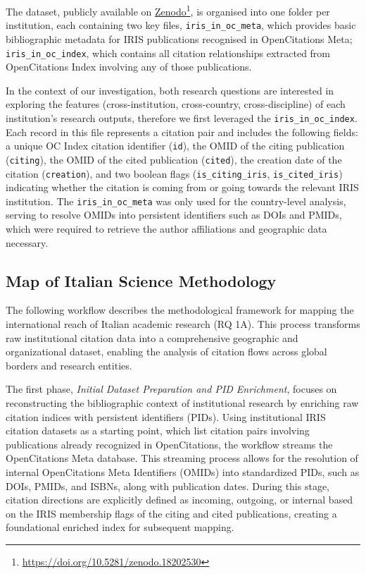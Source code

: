 \documentclass[year=2026]{cup-journal}
\begin{document}
The dataset, publicly available on \href{https://doi.org/10.5281/zenodo.18202530}{Zenodo}\footnote{\url{https://doi.org/10.5281/zenodo.18202530}}, is organised into one folder per institution, each containing two key files, \verb|iris_in_oc_meta|, which provides basic bibliographic metadata for IRIS publications recognised in OpenCitations Meta; \verb|iris_in_oc_index|, which contains all citation relationships extracted from OpenCitations Index involving any of those publications. 

In the context of our investigation, both research questions are interested in exploring the features (cross-institution, cross-country, cross-discipline) of each institution's research outputs, therefore we first leveraged the \verb|iris_in_oc_index|. Each record in this file represents a citation pair and includes the following fields: a unique OC Index citation identifier (\verb|id|), the OMID of the citing publication (\verb|citing|), the OMID of the cited publication (\verb|cited|), the creation date of the citation (\verb|creation|), and two boolean flags (\verb|is_citing_iris|, \verb|is_cited_iris|) indicating whether the citation is coming from or going towards the relevant IRIS institution. The \verb|iris_in_oc_meta| was only used for the country-level analysis, serving to resolve OMIDs into persistent identifiers such as DOIs and PMIDs, which were required to retrieve the author affiliations and geographic data necessary.

\subsection{Map of Italian Science Methodology}

The following workflow describes the methodological framework for mapping the international reach of Italian academic research (RQ 1A). This process transforms raw institutional citation data into a comprehensive geographic and organizational dataset, enabling the analysis of citation flows across global borders and research entities.

The first phase, \textit{Initial Dataset Preparation and PID Enrichment}, focuses on reconstructing the bibliographic context of institutional research by enriching raw citation indices with persistent identifiers (PIDs). Using institutional IRIS citation datasets as a starting point, which list citation pairs involving publications already recognized in OpenCitations, the workflow streams the OpenCitations Meta database. This streaming process allows for the resolution of internal OpenCitations Meta Identifiers (OMIDs) into standardized PIDs, such as DOIs, PMIDs, and ISBNs, along with publication dates. During this stage, citation directions are explicitly defined as incoming, outgoing, or internal based on the IRIS membership flags of the citing and cited publications, creating a foundational enriched index for subsequent mapping.
\end{document}
